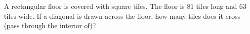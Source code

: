 A rectangular floor is covered with square tiles. The floor is $81$ tiles long and $63$ tiles wide. If a diagonal is drawn across the floor, how many tiles does it cross (pass through the interior of)?

